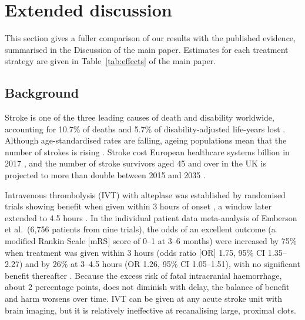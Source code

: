 \newpage

\section{Extended discussion}\label{sec:supp_discussion}

This section gives a fuller comparison of our results with the published evidence, summarised in the Discussion of the main paper. Estimates for each treatment strategy are given in Table~\ref{tab:effects} of the main paper.

\subsection{Background}\label{sec:supp_background}

Stroke is one of the three leading causes of death and disability worldwide, accounting for 10.7\% of deaths and 5.7\% of disability-adjusted life-years lost . Although age-standardised rates are falling, ageing populations mean that the number of strokes is rising . Stroke cost European healthcare systems  billion in 2017 , and the number of stroke survivors aged 45 and over in the UK is projected to more than double between 2015 and 2035 .

Intravenous thrombolysis (IVT) with alteplase was established by randomised trials showing benefit when given within 3 hours of onset , a window later extended to 4.5 hours . In the individual patient data meta-analysis of Emberson et al.\ (6{,}756 patients from nine trials), the odds of an excellent outcome (a modified Rankin Scale [mRS] score of 0--1 at 3--6 months) were increased by 75\% when treatment was given within 3 hours (odds ratio [OR] 1.75, 95\% CI 1.35--2.27) and by 26\% at 3--4.5 hours (OR 1.26, 95\% CI 1.05--1.51), with no significant benefit thereafter . Because the excess risk of fatal intracranial haemorrhage, about 2 percentage points, does not diminish with delay, the balance of benefit and harm worsens over time. IVT can be given at any acute stroke unit with brain imaging, but it is relatively ineffective at recanalising large, proximal clots.

